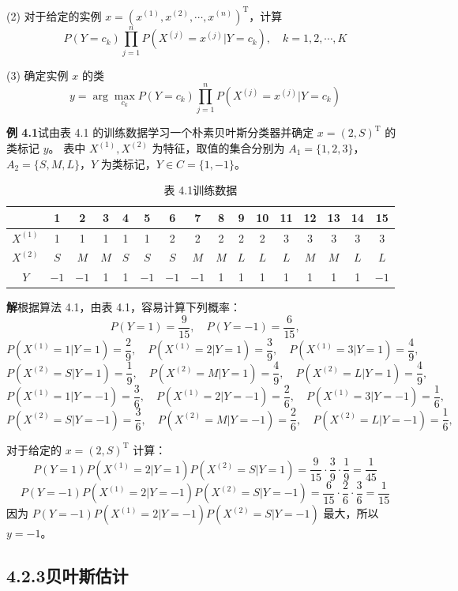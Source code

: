 \documentclass[UTF8, 12pt, fontset=fandol, oneside]{ctexart}
\begin{document}
(2) 对于给定的实例 $x=(x^{(1)},x^{(2)},\cdots,x^{(n)})^{\mathrm{T}}$，计算
\[
  P(Y=c_k)\prod_{j=1}^n P(X^{(j)}=x^{(j)}|Y=c_k),
  \quad k=1,2,\cdots,K
\]

(3) 确定实例 $x$ 的类
\[
  y=\arg\max_{c_k}P(Y=c_k)\prod_{j=1}^n P(X^{(j)}=x^{(j)}|Y=c_k)
\]

\noindent\textbf{例 4.1}\quad 试由表 4.1 的训练数据学习一个朴素贝叶斯分类器并确定 $x=(2,S)^{\mathrm{T}}$ 的类标记 $y$。
表中 $X^{(1)},X^{(2)}$ 为特征，取值的集合分别为 $A_1=\{1,2,3\}$，$A_2=\{S,M,L\}$，$Y$ 为类标记，$Y\in C=\{1,-1\}$。

\begin{table}[htbp]
\centering
\caption*{表 4.1\quad 训练数据}
\begin{tabular}{c|ccccccccccccccc}
\toprule
 & 1 & 2 & 3 & 4 & 5 & 6 & 7 & 8 & 9 & 10 & 11 & 12 & 13 & 14 & 15 \\
\midrule
$X^{(1)}$ & 1 & 1 & 1 & 1 & 1 & 2 & 2 & 2 & 2 & 2 & 3 & 3 & 3 & 3 & 3 \\
$X^{(2)}$ & $S$ & $M$ & $M$ & $S$ & $S$ & $S$ & $M$ & $M$ & $L$ & $L$ & $L$ & $M$ & $M$ & $L$ & $L$ \\
$Y$ & $-1$ & $-1$ & 1 & 1 & $-1$ & $-1$ & $-1$ & 1 & 1 & 1 & 1 & 1 & 1 & 1 & $-1$ \\
\bottomrule
\end{tabular}
\end{table}

\noindent\textbf{解}\quad 根据算法 4.1，由表 4.1，容易计算下列概率：
\[
  P(Y=1)=\frac{9}{15},\quad P(Y=-1)=\frac{6}{15},
\]
\[
  P(X^{(1)}=1|Y=1)=\frac{2}{9},\quad
  P(X^{(1)}=2|Y=1)=\frac{3}{9},\quad
  P(X^{(1)}=3|Y=1)=\frac{4}{9},
\]
\[
  P(X^{(2)}=S|Y=1)=\frac{1}{9},\quad
  P(X^{(2)}=M|Y=1)=\frac{4}{9},\quad
  P(X^{(2)}=L|Y=1)=\frac{4}{9},
\]
\[
  P(X^{(1)}=1|Y=-1)=\frac{3}{6},\quad
  P(X^{(1)}=2|Y=-1)=\frac{2}{6},\quad
  P(X^{(1)}=3|Y=-1)=\frac{1}{6},
\]
\[
  P(X^{(2)}=S|Y=-1)=\frac{3}{6},\quad
  P(X^{(2)}=M|Y=-1)=\frac{2}{6},\quad
  P(X^{(2)}=L|Y=-1)=\frac{1}{6},
\]

对于给定的 $x=(2,S)^{\mathrm{T}}$ 计算：
\[
  P(Y=1)P(X^{(1)}=2|Y=1)P(X^{(2)}=S|Y=1)
  =\frac{9}{15}\cdot\frac{3}{9}\cdot\frac{1}{9}
  =\frac{1}{45}
\]
\[
  P(Y=-1)P(X^{(1)}=2|Y=-1)P(X^{(2)}=S|Y=-1)
  =\frac{6}{15}\cdot\frac{2}{6}\cdot\frac{3}{6}
  =\frac{1}{15}
\]
因为 $P(Y=-1)P(X^{(1)}=2|Y=-1)P(X^{(2)}=S|Y=-1)$ 最大，所以 $y=-1$。

\subsection*{4.2.3\quad 贝叶斯估计}
\end{document}
